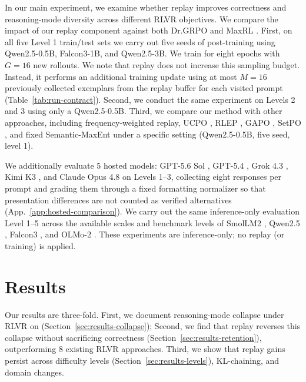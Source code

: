 In our main experiment, we examine whether replay improves correctness and reasoning-mode diversity across different RLVR objectives. 
We compare the impact of our replay component against both Dr.GRPO \citep{liu2025understanding} and MaxRL \citep{tajwar2026maxrl}. 
First, on all five \mb{} Level 1 train/test sets we carry out five seeds of post-training using Qwen2.5-0.5B, Falcon3-1B, and Qwen2.5-3B. We train for eight epochs with $G=16$ new rollouts. 
We note that replay does not increase this sampling budget. Instead, it performs an additional training update using at most $M=16$ previously collected exemplars from the replay buffer for each visited prompt (Table~\ref{tab:run-contract}).
Second, we conduct the same experiment on \mb{} Levels 2 and 3 using only a Qwen2.5-0.5B. 
Third, we compare our method with other approaches, including frequency-weighted replay, UCPO \citep{lochab2026ucpo}, RLEP \citep{zhang2025rlep}, GAPO \citep{anschel2025group}, SetPO \citep{li2026setpo}, and fixed Semantic-MaxEnt under a specific setting (Qwen2.5-0.5B, five seed, level 1).


We additionally evaluate 5 hosted models: GPT-5.6 Sol \citep{openai2026gpt56}, GPT-5.4 \citep{openai2026gpt54}, Grok 4.3 \citep{xai2026grok43}, Kimi K3 \citep{kimiteam2026kimik3}, and Claude Opus 4.8 \citep{anthropic2026opus48} on \mb{} Levels 1--3, collecting eight responses per prompt and grading them through a fixed formatting normalizer so that presentation differences are not counted as verified alternatives (App.~\ref{app:hosted-comparison}). We carry out the same inference-only evaluation Level 1--5 across the available scales and benchmark levels of SmolLM2 \citep{allal2025smollm2},
Qwen2.5 \citep{yang2024qwen25}, Falcon3 \citep{falconllm2024falcon3}, and OLMo-2 \citep{olmo20242olmo2furious}. These experiments are inference-only; no replay (or training) is applied.

\section{Results}
\label{sec:results}

Our results are three-fold.  First, we document reasoning-mode collapse under RLVR on \mb{} (Section~\ref{sec:results-collapse});
Second, we find that replay reverses this collapse without sacrificing correctness (Section~\ref{sec:results-retention}), outperforming 8 existing RLVR approaches.
Third, we show that replay gains persist across difficulty levels (Section~\ref{sec:results-levels}), KL-chaining, and domain changes.

